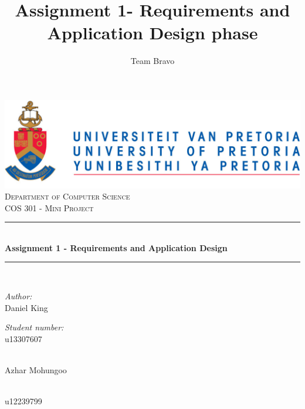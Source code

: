 \documentclass[a4paper,12pt]{report}
\author{Team Bravo}
\title{ Assignment 1- Requirements and Application Design phase}
\newcommand{\HRule}{\rule{\linewidth}{0.5mm}}
\begin{document}
\setlength{\parskip}{6pt}

\begin{titlepage}

\begin{center}
\includegraphics[width=1\textwidth]{./University_of_Pretoria_Logo.PNG}\\[0.4cm]    
\textsc{\LARGE Department of Computer Science}\\[1.5cm]
\textsc{\Large COS 301 - Mini Project}\\[0.5cm]
\HRule \\[0.4cm]
{ \huge \bfseries Assignment 1 - Requirements and Application Design}\\[0.4cm]
\HRule \\[0.4cm]
\begin{minipage}{0.4\textwidth}
\begin{flushleft} \large
\emph{Author:}\\
Daniel {King}
\end{flushleft}
\end{minipage}
\begin{minipage}{0.4\textwidth}
\begin{flushright} \large
\emph{Student number:} \\
u13307607
\end{flushright}
\end{minipage}
\begin{minipage}{0.4\textwidth}
\begin{flushleft} \large
\emph{} \\
Azhar {Mohungoo }
\end{flushleft}
\end{minipage}
\begin{minipage}{0.4\textwidth}
\begin{flushright} \large
\emph{} \\
u12239799
\end{flushright}
\end{minipage}
\begin{minipage}{0.4\textwidth}

\end{minipage}
\end{center}
\end{titlepage}
\end{document}
